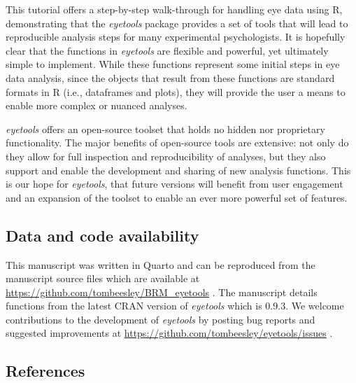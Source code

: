 \documentclass[
  man,
  floatsintext,
  longtable,
  nolmodern,
  notxfonts,
  notimes,
  colorlinks=true,linkcolor=blue,citecolor=blue,urlcolor=blue]{apa7}
\begin{document}
This tutorial offers a step-by-step walk-through for handling eye data
using R, demonstrating that the \emph{eyetools} package provides a set
of tools that will lead to reproducible analysis steps for many
experimental psychologists. It is hopefully clear that the functions in
\emph{eyetools} are flexible and powerful, yet ultimately simple to
implement. While these functions represent some initial steps in eye
data analysis, since the objects that result from these functions are
standard formats in R (i.e., dataframes and plots), they will provide
the user a means to enable more complex or nuanced analyses.

\emph{eyetools} offers an open-source toolset that holds no hidden nor
proprietary functionality. The major benefits of open-source tools are
extensive: not only do they allow for full inspection and
reproducibility of analyses, but they also support and enable the
development and sharing of new analysis functions. This is our hope for
\emph{eyetools}, that future versions will benefit from user engagement
and an expansion of the toolset to enable an ever more powerful set of
features.

\subsection{Data and code
availability}\label{data-and-code-availability}

This manuscript was written in Quarto and can be reproduced from the
manuscript source files which are available at
\url{https://github.com/tombeesley/BRM_eyetools} . The manuscript
details functions from the latest CRAN version of \emph{eyetools} which
is 0.9.3. We welcome contributions to the development of \emph{eyetools}
by posting bug reports and suggested improvements at
\url{https://github.com/tombeesley/eyetools/issues} .

\subsection{References}\label{references}
\end{document}
